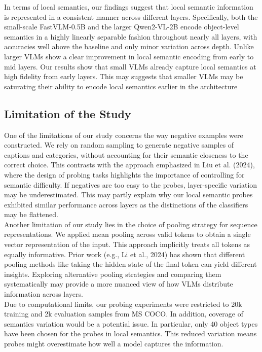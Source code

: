 \documentclass[11pt]{article}
\begin{document}
In terms of local semantics, our findings suggest that local semantic information is represented in a consistent manner across different layers.
Specifically, both the small-scale FastVLM-0.5B and the larger Qwen2-VL-2B encode object-level semantics in a highly linearly separable fashion throughout nearly all layers, with accuracies well above the baseline and only minor variation across depth.
Unlike larger VLMs show a clear improvement in local semantic encoding from early to mid layers. Our results show that small VLMs already capture local semantics at high fidelity from early layers.
This may suggests that smaller VLMs may be saturating their ability to encode local semantics earlier in the architecture

\subsection{Limitation of the Study}
One of the limitations of our study concerns the way negative examples were constructed. We rely on random sampling to generate negative samples of captions and categories, without accounting for their semantic closeness to the correct choice.
This contrasts with the approach emphasized in Liu et al. (2024), where the design of probing tasks highlights the importance of controlling for semantic difficulty.
If negatives are too easy to the probes, layer-specific variation may be underestimated.
This may partly explain why our local semantic probes exhibited similar performance across layers as the distinctions of the classifiers may be flattened. \\

Another limitation of our study lies in the choice of pooling strategy for sequence representations.
We applied mean pooling across valid tokens to obtain a single vector representation of the input. This approach implicitly treats all tokens as equally informative.
Prior work (e.g., Li et al., 2024) has shown that different pooling methods like taking the hidden state of the final token can yield different insights. Exploring alternative pooling strategies and comparing them systematically may provide a more nuanced view of how VLMs distribute information across layers. \\

Due to computational limits, our probing experiments were restricted to 20k training and 2k evaluation samples from MS COCO.
In addition, coverage of semantics variation would be a potential issue.
In particular, only 40 object types have been chosen for the probes in local semantics.
This reduced variation means probes might overestimate how well a model captures the information.
\end{document}
